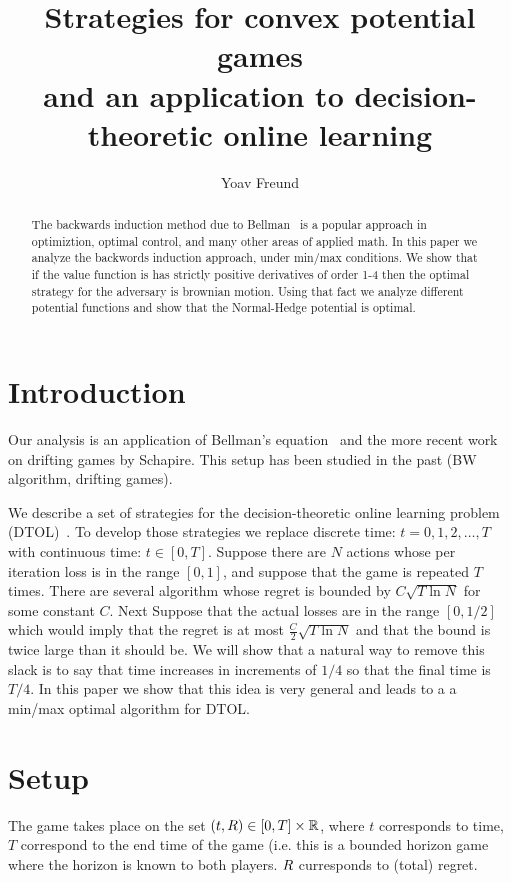 \documentclass{article}[12pt]
\title{Strategies for convex potential games \\
  and an application to
  decision-theoretic online learning}
\author{Yoav Freund}
\begin{document}
\maketitle
\begin{abstract}
The backwards induction method due to Bellman~\cite{bellman1952theory}
is a popular approach in optimiztion, optimal control, and many other
areas of applied math. In this paper we analyze the backwords
induction approach, under min/max conditions. We show that if the
value function is has strictly positive derivatives of order 1-4 then
the optimal strategy for the adversary is brownian motion. Using that
fact we analyze different potential functions and show that the
Normal-Hedge potential is optimal.
\end{abstract}

\section{Introduction}

Our analysis is an application of Bellman's
equation~\cite{bellman1952theory} and the more recent work on drifting
games by Schapire\cite{schapire2001drifting}.
This setup has been studied
in the past (BW algorithm, drifting games).

We describe a set of strategies for the decision-theoretic online
learning problem (DTOL)~\cite{}. To develop those strategies we
replace discrete time: $t=0,1,2,\ldots,T$ with
continuous time: $t \in [0,T]$. Suppose there are $N$ actions whose per iteration
loss is in the range $[0,1]$, and suppose that the game is repeated
$T$ times. There are several algorithm whose regret is bounded by
$C\sqrt{T \ln N}$ for some constant $C$. Next Suppose that the
actual losses are in the range $[0,1/2]$ which would imply that the
regret is at most $\frac{C}{2}\sqrt{T \ln N}$ and that the bound is
twice large than it should be. We will show that a natural way to
remove this slack is to say that time increases in increments of
$1/4$ so that the final time is $T/4$. In this paper we show that this
idea is very general and leads to a a min/max optimal algorithm for DTOL.


\section{Setup}
The game takes place on the set $(t,R) \in [0,T] \times \mathbb{R}$,
where $t$ corresponds to time, $T$ correspond to the
end time of the game (i.e. this is a bounded horizon game where the
horizon is known to both players. $R$ curresponds to (total) regret.
\end{document}
